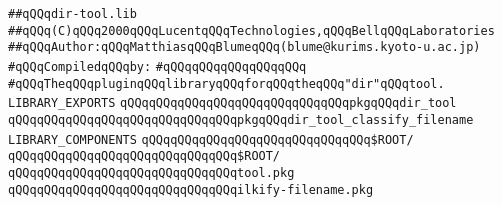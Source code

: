 \label{src/app/makelib/tools/dir/dir-tool.lib}
\verb|##qQQqdir-tool.lib|\newline
\verb|##qQQq(C)qQQq2000qQQqLucentqQQqTechnologies,qQQqBellqQQqLaboratories|\newline
\verb|##qQQqAuthor:qQQqMatthiasqQQqBlumeqQQq(blume@kurims.kyoto-u.ac.jp)|\newline
\newline
\verb|#qQQqCompiledqQQqby:|\newline
\verb|#qQQqqQQqqQQqqQQqqQQq|\newline
\newline
\newline
\newline
\verb|#qQQqTheqQQqpluginqQQqlibraryqQQqforqQQqtheqQQq"dir"qQQqtool.|\newline
\newline
\newline
\newline
\newline
\verb|LIBRARY_EXPORTS|\newline
\newline
\verb|qQQqqQQqqQQqqQQqqQQqqQQqqQQqqQQqpkgqQQqdir_tool|\newline
\verb|qQQqqQQqqQQqqQQqqQQqqQQqqQQqqQQqpkgqQQqdir_tool_classify_filename|\newline
\newline
\newline
\newline
\verb|LIBRARY_COMPONENTS|\newline
\newline
\verb|qQQqqQQqqQQqqQQqqQQqqQQqqQQqqQQq$ROOT/|\newline
\verb|qQQqqQQqqQQqqQQqqQQqqQQqqQQqqQQq$ROOT/|\newline
\verb|qQQqqQQqqQQqqQQqqQQqqQQqqQQqqQQqtool.pkg|\newline
\verb|qQQqqQQqqQQqqQQqqQQqqQQqqQQqqQQqilkify-filename.pkg|\newline

